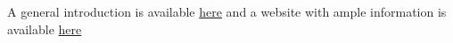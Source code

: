 \documentclass{article}
\begin{document}
A general introduction is available \href{./pdfs/histotripsy.pdf}{here}
and a website with ample information is available
\href{http://www.histotripsy.umich.edu}{here}
\begin{Verbatim}[commandchars=\\\{\},gobble=2,numbers=left,fontsize=\small,baselinestretch=1]

    \end{Verbatim}


    
    
    
    
\end{document}
